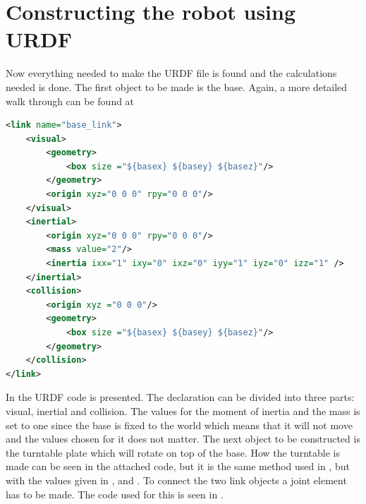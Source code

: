 \section{Constructing the robot using URDF}\label{sec:makingurdf}
Now everything needed to make the URDF file is found and the calculations needed is done. The first object to be made is the base. Again, a more detailed walk through can be found at \cite{ROSWiki,GazeboURDF}\\
\begin{lstlisting}[language=xml,caption={URDF code for the base},label={lst:base}]
<link name="base_link">
    <visual>
        <geometry>
            <box size ="${basex} ${basey} ${basez}"/>
        </geometry>
        <origin xyz="0 0 0" rpy="0 0 0"/>
    </visual>
    <inertial>
        <origin xyz="0 0 0" rpy="0 0 0"/>
        <mass value="2"/>
        <inertia ixx="1" ixy="0" ixz="0" iyy="1" iyz="0" izz="1" />
    </inertial>
    <collision>
        <origin xyz ="0 0 0"/>
        <geometry>
            <box size ="${basex} ${basey} ${basez}"/>
        </geometry>
    </collision>
</link>
\end{lstlisting}
In  the URDF code is presented. The declaration can be divided into three parts: visual, inertial and collision. The values for the moment of inertia and the mass is set to one since the base is fixed to the world which means that it will not move and the values chosen for it does not matter. The next object to be constructed is the turntable plate which will rotate on top of the base. How the turntable is made can be seen in the attached code, but it is the same method used in , but with the values given in ,  and . To connect the two link objects a joint element has to be made. The code used for this is seen in .

